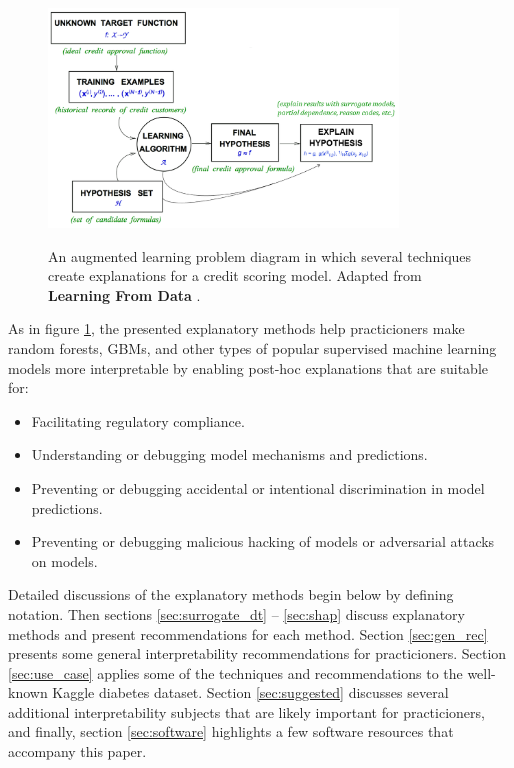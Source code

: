\documentclass{article}
\begin{document}
\begin{figure}[htb]
	\begin{center}
		\includegraphics[height=165pt]{img/figure_1.png}
		\label{fig:learning_problem}
		\caption{An augmented learning problem diagram in which several techniques create explanations for a credit scoring model. Adapted from \textbf{Learning From Data} \cite{lfd}.}
	\end{center}
\end{figure}	
	
As in figure \ref{fig:learning_problem}, the presented explanatory methods help practicioners make random forests, GBMs, and other types of popular supervised  machine learning models more interpretable by enabling post-hoc explanations that are suitable for:\\

\begin{itemize}
	\item Facilitating regulatory compliance.
	\item Understanding or debugging model mechanisms and predictions.
	\item Preventing or debugging accidental or intentional discrimination in model predictions.
	\item Preventing or debugging malicious hacking of models or adversarial attacks on models.
\end{itemize}

Detailed discussions of the explanatory methods begin below by defining notation. Then sections \ref{sec:surrogate_dt} -- \ref{sec:shap} discuss explanatory methods and present recommendations for each method. Section \ref{sec:gen_rec} presents some general interpretability recommendations for practicioners. Section \ref{sec:use_case} applies some of the techniques and recommendations to the well-known Kaggle diabetes dataset. Section \ref{sec:suggested} discusses several additional interpretability subjects that are likely important for practicioners, and finally, section \ref{sec:software} highlights a few software resources that accompany this paper. 
\end{document}
